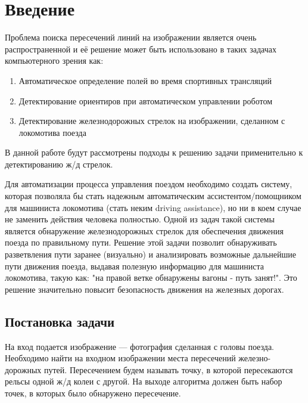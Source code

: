 \chapter{Введение}
\justify
Проблема поиска пересечений линий на изображении является очень распространенной и её решение может быть использовано в таких задачах компьютерного зрения как:
\begin{enumerate}
	\item Автоматическое определение полей во время спортивных трансляций
	\item Детектирование ориентиров при автоматическом управлении роботом
	\item Детектирование железнодорожных стрелок на изображении, сделанном с локомотива поезда
\end{enumerate} 


В данной работе будут рассмотрены подходы к решению задачи применительно к детектированию ж/д стрелок.


Для автоматизации процесса управления поездом необходимо создать систему, которая позволяла бы стать надежным автоматическим ассистентом/помощником для машиниста локомотива (стать неким driving assistance), но ни в коем случае не заменить действия человека полностью. 
Одной из задач такой системы является обнаружение железнодорожных стрелок для обеспечения движения поезда по правильному пути.
Решение этой задачи позволит обнаруживать разветвления пути заранее (визуально) и анализировать возможные дальнейшие пути движения поезда, выдавая полезную информацию для машиниста локомотива, такую как: "на правой ветке обнаружены вагоны - путь занят!". Это решение значительно повысит безопасность движения на железных дорогах.

\newpage
\section{Постановка задачи}
На вход подается изображение — фотография сделанная с головы поезда. Необходимо найти на входном изображении места пересечений железно-дорожных путей. Пересечением будем называть точку, в которой пересекаются рельсы одной ж/д колеи с другой. На выходе алгоритма должен быть набор точек, в которых было обнаружено пересечение.

